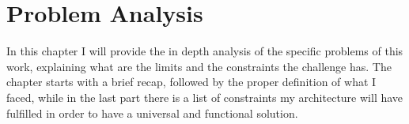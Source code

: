 %
%
\chapter{Problem Analysis}
%
\label{cap:probanalysis}
%
%

In this chapter I will provide the in depth analysis of the specific problems of this work, explaining what are the limits and the constraints the challenge has. The chapter starts with a brief recap, followed by the proper definition of what I faced, while in the last part there is a list of constraints my architecture will have fulfilled in order to have a universal and functional solution.
  

